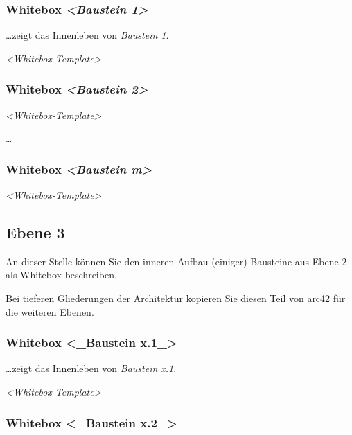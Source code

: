 \documentclass[]{article}
\begin{document}
\subsubsection{\texorpdfstring{Whitebox \emph{\textless{}Baustein
1\textgreater{}}}{Whitebox \textless{}Baustein 1\textgreater{}}}\label{_whitebox_emphasis_baustein_1_emphasis}

\ldots{}zeigt das Innenleben von \emph{Baustein 1}.

\emph{\textless{}Whitebox-Template\textgreater{}}

\subsubsection{\texorpdfstring{Whitebox \emph{\textless{}Baustein
2\textgreater{}}}{Whitebox \textless{}Baustein 2\textgreater{}}}\label{_whitebox_emphasis_baustein_2_emphasis}

\emph{\textless{}Whitebox-Template\textgreater{}}

\ldots{}

\subsubsection{\texorpdfstring{Whitebox \emph{\textless{}Baustein
m\textgreater{}}}{Whitebox \textless{}Baustein m\textgreater{}}}\label{_whitebox_emphasis_baustein_m_emphasis}

\emph{\textless{}Whitebox-Template\textgreater{}}

\subsection{Ebene 3}\label{_ebene_3}

An dieser Stelle können Sie den inneren Aufbau (einiger) Bausteine aus
Ebene 2 als Whitebox beschreiben.

Bei tieferen Gliederungen der Architektur kopieren Sie diesen Teil von
arc42 für die weiteren Ebenen.

\subsubsection{Whitebox \textless{}\_Baustein
x.1\_\textgreater{}}\label{_whitebox_baustein_x_1}

\ldots{}zeigt das Innenleben von \emph{Baustein x.1}.

\emph{\textless{}Whitebox-Template\textgreater{}}

\subsubsection{Whitebox \textless{}\_Baustein
x.2\_\textgreater{}}\label{_whitebox_baustein_x_2}
\end{document}
